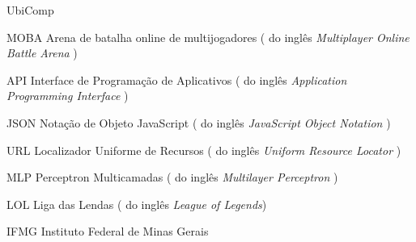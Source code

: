 \begin{listofabbrv}{UbiComp}
	

	  \item [MOBA]        Arena de batalha online de multijogadores ( do inglês \textit{Multiplayer Online Battle Arena} )

  	\item [API]        Interface de Programação de Aplicativos ( do inglês \textit{Application Programming Interface} )
  	\item [JSON]        Notação de Objeto JavaScript ( do inglês \textit{ JavaScript Object Notation} )
  	\item [URL]        Localizador Uniforme de Recursos ( do inglês \textit{Uniform Resource Locator} )
  	\item [MLP]        Perceptron Multicamadas ( do inglês \textit{Multilayer Perceptron} )
  	\item [LOL]	 Liga das Lendas ( do inglês \textit{League of Legends})
  	\item [IFMG]	 Instituto Federal de Minas Gerais
    
\end{listofabbrv}